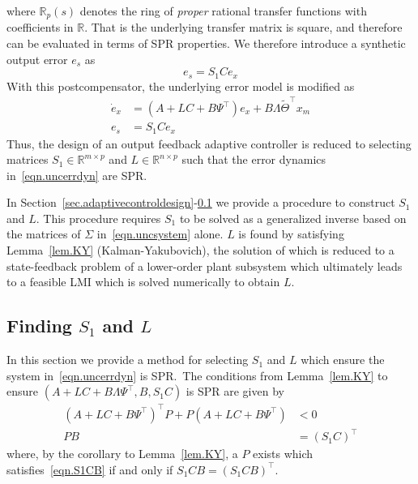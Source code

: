 \documentclass[]{../sty/aiaa-tc}
\begin{document}
  where $\mathbb{R}_{p}(s)$ denotes the ring of \textit{proper} rational transfer functions with coefficients in $\mathbb{R}$.
  That is the underlying transfer matrix is square, and therefore can be evaluated in terms of SPR properties.
  We therefore introduce a synthetic output error $e_s$ as
  \begin{equation*}
    e_{s}=S_{1}Ce_{x}
  \end{equation*}
  With this postcompensator, the underlying error model is modified as
  \begin{equation}
    \label{eqn.uncerrdyn}
    \begin{split}
      \dot{e}_{x}&=(A+LC+B\Psi^{\top})e_{x}+B\Lambda\widetilde{\Theta}^{\top}x_{m} \\
      e_{s}&=S_{1}Ce_{x}
    \end{split}
  \end{equation}
  Thus, the design of an output feedback adaptive controller is reduced to selecting matrices $S_{1}\in\mathbb{R}^{m\times p}$ and $L\in\mathbb{R}^{n\times p}$ such that the error dynamics in\ \eqref{eqn.uncerrdyn} are SPR.\@

  In Section~\ref{sec.adaptivecontroldesign}-\ref{sec.findingS1andL} we provide a procedure to construct $S_{1}$ and $L$.
  This procedure requires $S_{1}$ to be solved as a generalized inverse based on the matrices of $\Sigma$ in\ \eqref{eqn.uncsystem} alone.
  $L$ is found by satisfying Lemma~\ref{lem.KY} (Kalman-Yakubovich), the solution of which is reduced to a state-feedback problem of a lower-order plant subsystem which ultimately leads to a feasible LMI which is solved numerically to obtain $L$.

  \subsection{Finding \texorpdfstring{$S_{1}$ and $L$}{S1 and L}}\label{sec.findingS1andL}

  In this section we provide a method for selecting $S_{1}$ and $L$ which ensure the system in\ \eqref{eqn.uncerrdyn} is SPR.\
  The conditions from Lemma~\ref{lem.KY} to ensure $(A+LC+B\Lambda\Psi^{\top},B,S_{1}C)$ is SPR are given by
  \begin{align}
    \label{eqn.lyapal}
    (A+LC+B\Psi^{\top})^{\top}P+P(A+LC+B\Psi^{\top})&<0 \\
    \label{eqn.S1CB}
    PB&=(S_{1}C)^{\top}
  \end{align}
  where, by the corollary to Lemma~\ref{lem.KY}, a $P$ exists which satisfies\ \eqref{eqn.S1CB} if and only if $S_{1}CB=(S_{1}CB)^{\top}$.
\end{document}
